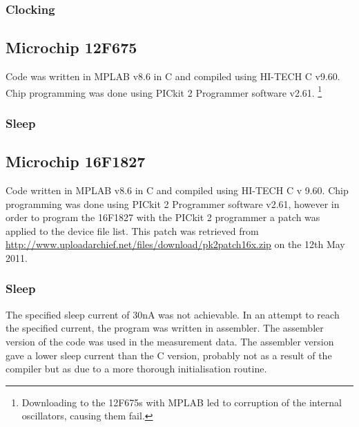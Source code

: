 


\subsubsection*{Clocking}




\subsection{Microchip 12F675}

Code was written in MPLAB v8.6 in C and compiled using HI-TECH C v9.60.
Chip programming was done using PICkit 2 Programmer software v2.61.
\footnote{Downloading to the 12F675s with MPLAB led to corruption of the internal
oscillators, causing them fail.%
}


\subsubsection*{Sleep}


\subsection{Microchip 16F1827}

Code written in MPLAB v8.6 in C and compiled using HI-TECH C v 9.60.
Chip programming was done using PICkit 2 Programmer software v2.61,
however in order to program the 16F1827 with the PICkit 2 programmer
a patch was applied to the device file list. This patch was retrieved
from \url{http://www.uploadarchief.net/files/download/pk2patch16x.zip}
on the 12th May 2011.


\subsubsection*{Sleep}

The specified sleep current of 30nA was not achievable. In an attempt
to reach the specified current, the program was written in assembler.
The assembler version of the code was used in the measurement data.
The assembler version gave a lower sleep current than the C version,
probably not as a result of the compiler but as due to a more thorough
initialisation routine.

